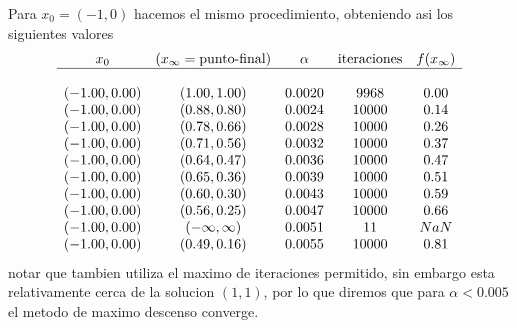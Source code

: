 \documentclass[letterpaper]{article}
\begin{document}
Para \(x_0 = (-1,0)\) hacemos el mismo procedimiento, obteniendo asi los
siguientes valores
\[
\begin{array}{c c c c c}
  x_0 & (x_{\infty} = \text{punto-final}) & \alpha & \text{iteraciones} &
    f(x_{\infty}) \\
  \hline \\
  (-1.00, 0.00) & (1.00, 1.00)      & 0.0020 & 9968  & 0.00 \\
  (-1.00, 0.00) & (0.88, 0.80)      & 0.0024 & 10000 & 0.14 \\
  (-1.00, 0.00) & (0.78, 0.66)      & 0.0028 & 10000 & 0.26 \\
  (-1.00, 0.00) & (0.71, 0.56)      & 0.0032 & 10000 & 0.37 \\
  (-1.00, 0.00) & (0.64, 0.47)      & 0.0036 & 10000 & 0.47 \\
  (-1.00, 0.00) & (0.65, 0.36)      & 0.0039 & 10000 & 0.51 \\
  (-1.00, 0.00) & (0.60, 0.30)      & 0.0043 & 10000 & 0.59 \\
  (-1.00, 0.00) & (0.56, 0.25)      & 0.0047 & 10000 & 0.66 \\
  (-1.00, 0.00) & (-\infty, \infty) & 0.0051 & 11    & NaN  \\
  (-1.00, 0.00) & (0.49, 0.16)      & 0.0055 & 10000 & 0.81 \\
\end{array}
\]
notar que tambien utiliza el maximo de iteraciones permitido, sin embargo
esta relativamente cerca de la solucion \((1,1)\), por lo que diremos que
para \(\alpha < 0.005\) el metodo de maximo descenso converge.
\end{document}
